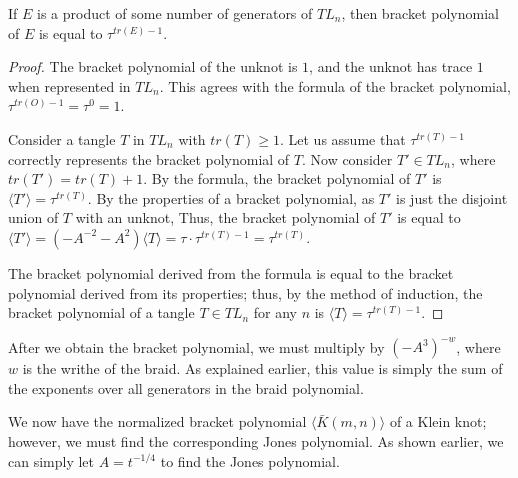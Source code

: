\documentclass[12pt]{article}
\newenvironment{theorem}[2][Theorem]{\begin{trivlist}
\item[\hskip \labelsep {\bfseries #1}\hskip \labelsep {\bfseries #2.}]}{\end{trivlist}}
\begin{document}
\begin{theorem}{3.3}
If $E$ is a product of some number of generators of $TL_n$, then bracket polynomial of $E$ is equal to $\tau^{tr(E) - 1}$. 

\end{theorem}

\begin{proof}
The bracket polynomial of the unknot is $1$, and the unknot has trace $1$ when represented in $TL_n$. This agrees with the formula of the bracket polynomial, $\tau^{tr(O) - 1} = \tau^{0} = 1$. 

Consider a tangle $T$ in $TL_n$ with $tr(T) \geq 1$. Let us assume that $\tau^{tr(T) - 1}$ correctly represents the bracket polynomial of $T$. Now consider $T' \in TL_n$, where $tr(T') = tr(T) + 1$. By the formula, the bracket polynomial of $T'$ is $\langle T' \rangle = \tau^{tr(T)}$. By the properties of a bracket polynomial, as $T'$ is just the disjoint union of $T$ with an unknot, Thus, the bracket polynomial of $T'$ is equal to $\langle T' \rangle = (-A^{-2} - A^2) \langle T \rangle = \tau \cdot \tau^{tr(T) - 1} = \tau^{tr(T)}$. 

The bracket polynomial derived from the formula is equal to the bracket polynomial derived from its properties; thus, by the method of induction, the bracket polynomial of a tangle $T \in TL_n$ for any $n$ is $\langle T \rangle = \tau^{tr(T) - 1}$. 


\end{proof}

After we obtain the bracket polynomial, we must multiply by $(-A^3)^{-w}$, where $w$ is the writhe of the braid. As explained earlier, this value is simply the sum of the exponents over all generators in the braid polynomial. 

We now have the normalized bracket polynomial $\langle \bar{K}(m, n) \rangle$ of a Klein knot; however, we must find the corresponding Jones polynomial. As shown earlier, we can simply let $A = t^{-1/4}$ to find the Jones polynomial. 
\end{document}
